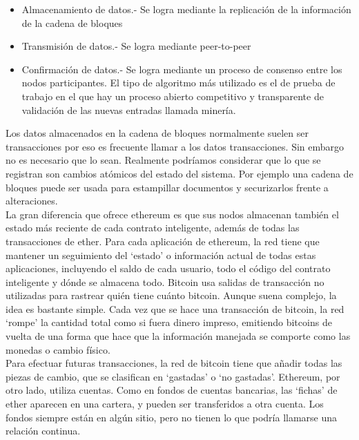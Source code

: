 \documentclass[11pt,a4paper]{article}
\begin{document}
\begin{itemize}
\item Almacenamiento de datos.- Se logra mediante la replicación de la información de la cadena de bloques
\item Transmisión de datos.- Se logra mediante peer-to-peer
\item Confirmación de datos.- Se logra mediante un proceso de consenso entre los nodos participantes. El tipo de algoritmo más utilizado es el de prueba de trabajo en el que hay un proceso abierto competitivo y transparente de validación de las nuevas entradas llamada minería.
\end{itemize}
Los datos almacenados en la cadena de bloques normalmente suelen ser transacciones por eso es frecuente llamar a los datos transacciones. Sin embargo no es necesario que lo sean. Realmente podríamos considerar que lo que se registran son cambios atómicos del estado del sistema. Por ejemplo una cadena de bloques puede ser usada para estampillar documentos y securizarlos frente a alteraciones.\\

La gran diferencia que ofrece ethereum es que sus nodos almacenan también el estado más reciente de cada contrato inteligente, además de todas las transacciones de ether. Para cada aplicación de ethereum, la red tiene que mantener un seguimiento del ‘estado’ o información actual de todas estas aplicaciones, incluyendo el saldo de cada usuario, todo el código del contrato inteligente y dónde se almacena todo. Bitcoin usa salidas de transacción no utilizadas para rastrear quién tiene cuánto bitcoin.
Aunque suena complejo, la idea es bastante simple. Cada vez que se hace una transacción de bitcoin, la red ‘rompe’ la cantidad total como si fuera dinero impreso, emitiendo bitcoins de vuelta de una forma que hace que la información manejada se comporte como las monedas o cambio físico.\\

Para efectuar futuras transacciones, la red de bitcoin tiene que añadir todas las piezas de cambio, que se clasifican en ‘gastadas’ o ‘no gastadas’. Ethereum, por otro lado, utiliza cuentas. Como en fondos de cuentas bancarias, las ‘fichas’ de ether aparecen en una cartera, y pueden ser transferidos a otra cuenta. Los fondos siempre están en algún sitio, pero no tienen lo que podría llamarse una relación continua.\\
\end{document}

